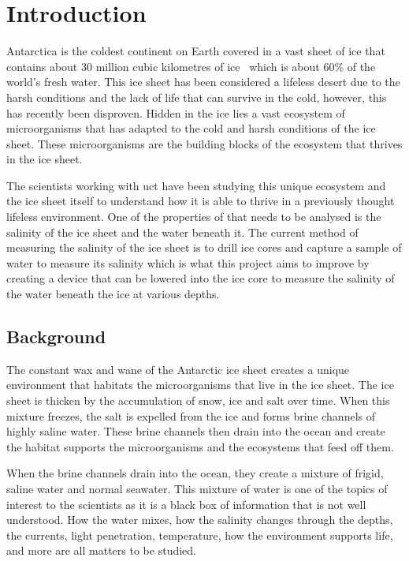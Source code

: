 
\chapter{Introduction}

Antarctica is the coldest continent on Earth covered in a vast sheet of ice that contains about 30 million cubic kilometres of ice~\cite{NSIDC_ice_sheet_facts_2024} which is about 60\% of the world's fresh water.
This ice sheet has been considered a lifeless desert due to the harsh conditions and the lack of life that can survive in the cold, however, this has recently been disproven.
Hidden in the ice lies a vast ecosystem of microorganisms that has adapted to the cold and harsh conditions of the ice sheet.
These microorganisms are the building blocks of the ecosystem that thrives in the ice sheet.

The scientists working with \gls{uct} have been studying this unique ecosystem and the ice sheet itself to understand how it is able to thrive in a previously thought lifeless environment.
One of the properties of that needs to be analysed is the salinity of the ice sheet and the water beneath it.
The current method of measuring the salinity of the ice sheet is to drill ice cores and capture a sample of water to measure its salinity which is what this project aims to improve by creating a device that can be lowered into the ice core to measure the salinity of the water beneath the ice at various depths.

\section{Background}
The constant wax and wane of the Antarctic ice sheet creates a unique environment that habitats the microorganisms that live in the ice sheet.
The ice sheet is thicken by the accumulation of snow, ice and salt over time. 
When this mixture freezes, the salt is expelled from the ice and forms brine channels of highly saline water.
These brine channels then drain into the ocean and create the habitat supports the microorganisms and the ecosystems that feed off them.

When the brine channels drain into the ocean, they create a mixture of frigid, saline water and normal seawater.
This mixture of water is one of the topics of interest to the scientists as it is a black box of information that is not well understood.
How the water mixes, how the salinity changes through the depths, the currents, light penetration, temperature, how the environment supports life, and more are all matters to be studied.

